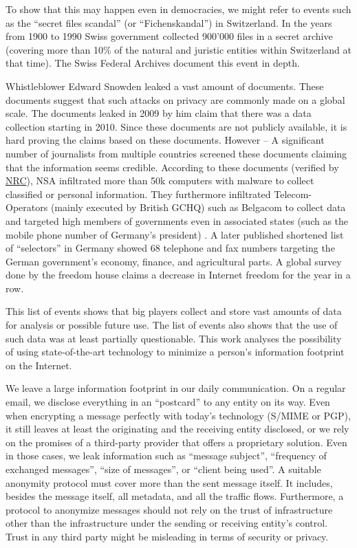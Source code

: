 To show that this may happen even in democracies, we might refer to events such as the ``secret files scandal'' (or  ``Fichenskandal'') in Switzerland. In the years from 1900 to 1990 Swiss government collected 900’000 files in a secret archive (covering more than 10\% of the natural and juristic entities within Switzerland at that time). The Swiss Federal Archives document this event in depth\cite{Leuenberger1989}.

Whistleblower Edward Snowden leaked a vast amount of documents. These documents suggest that such attacks on privacy are commonly made on a global scale. The documents leaked in 2009 by him claim that there was a data collection starting in 2010. Since these documents are not publicly available, it is hard proving the claims based on these documents. However -- A significant number of journalists from multiple countries screened these documents claiming that the information seems credible. According to these documents (verified by \href{http://www.nrc.nl/nieuws/2013/11/23/nederland-sinds-1946-doelwit-van-nsa}{NRC}), NSA infiltrated more than 50k computers with malware to collect classified or personal information. They furthermore infiltrated Telecom-Operators (mainly executed by British GCHQ) such as Belgacom to collect data and targeted high members of governments even in associated states (such as the mobile phone number of Germany's president) \cite{NCR2013,XKeyscore,Ball2013,Ackerman2013,Greenberg2013}. A later published shortened list of ``selectors'' in Germany showed 68 telephone and fax numbers targeting the German government's economy, finance, and agricultural parts. A global survey done by the freedom house\cite{FOTN2020} claims a decrease in Internet freedom for the  year in a row. 

This list of events shows that big players collect and store vast amounts of data for analysis or possible future use. The list of events also shows that the use of such data was at least partially questionable. This work analyses the possibility of using state-of-the-art technology to minimize a person's information footprint on the Internet. 

We leave a large information footprint in our daily communication. On a regular email, we disclose everything in an ``postcard'' to any entity on its way. Even when encrypting a message perfectly with today's technology (S/MIME\cite{rfc2045} or PGP\cite{rfc2015}), it still leaves at least the originating and the receiving entity disclosed, or we rely on the promises of a third-party provider that offers a proprietary solution. Even in those cases, we leak information such as ``message subject'', ``frequency of exchanged messages'', ``size of messages'', or ``client being used''. A suitable anonymity protocol must cover more than the sent message itself. It includes, besides the message itself, all metadata, and all the traffic flows. Furthermore, a protocol to anonymize messages should not rely on the trust of infrastructure other than the infrastructure under the sending or receiving entity's control. Trust in any third party might be misleading in terms of security or privacy.

